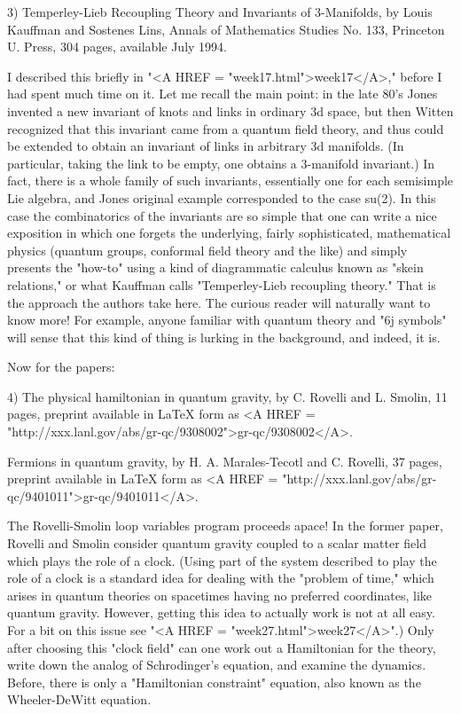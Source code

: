 3) Temperley-Lieb Recoupling Theory and Invariants of 3-Manifolds, by
Louis Kauffman and Sostenes Lins, Annals of Mathematics Studies No. 133,
Princeton U. Press, 304 pages, available July 1994. 

I described this briefly in "<A HREF = "week17.html">week17</A>," before I had spent much time on
it.  Let me recall the main point: in the late 80's Jones invented a new
invariant of knots and links in ordinary 3d space, but then Witten
recognized that this invariant came from a quantum field theory, and
thus could be extended to obtain an invariant of links in arbitrary 3d
manifolds.  (In particular, taking the link to be empty, one obtains a
3-manifold invariant.)  In fact, there is a whole family of such
invariants, essentially one for each semisimple Lie algebra, and Jones
original example corresponded to the case su(2).  In this case the
combinatorics of the invariants are so simple that one can write a nice
exposition in which one forgets the underlying, fairly sophisticated,
mathematical physics (quantum groups, conformal field theory and the
like) and simply presents the "how-to" using a kind of diagrammatic
calculus known as "skein relations," or what Kauffman calls
"Temperley-Lieb recoupling theory."  That is the approach the authors
take here.  The curious reader will naturally want to know more!  For
example, anyone familiar with quantum theory and "6j symbols" will sense
that this kind of thing is lurking in the background, and indeed, it is.

Now for the papers:

4) The physical hamiltonian in quantum gravity, by C. Rovelli and L.
Smolin, 11 pages, preprint available in LaTeX form as <A HREF = "http://xxx.lanl.gov/abs/gr-qc/9308002">gr-qc/9308002</A>.

Fermions in quantum gravity, by H. A. Marales-Tecotl and C. Rovelli,
37 pages, preprint available in LaTeX form as <A HREF = "http://xxx.lanl.gov/abs/gr-qc/9401011">gr-qc/9401011</A>. 
 
The Rovelli-Smolin loop variables program proceeds apace!  In the former
paper, Rovelli and Smolin consider quantum gravity coupled to a scalar
matter field which plays the role of a clock.  (Using part of the system
described to play the role of a clock is a standard idea for dealing
with the "problem of time," which arises in quantum theories on
spacetimes having no preferred coordinates, like quantum gravity.
However, getting this idea to actually work is not at all easy.  For a
bit on this issue see "<A HREF = "week27.html">week27</A>".)  Only after choosing this "clock field"
can one work out a Hamiltonian for the theory, write down the analog of
Schrodinger's equation, and examine the dynamics.  Before, there is only
a "Hamiltonian constraint" equation, also known as the Wheeler-DeWitt
equation.  

